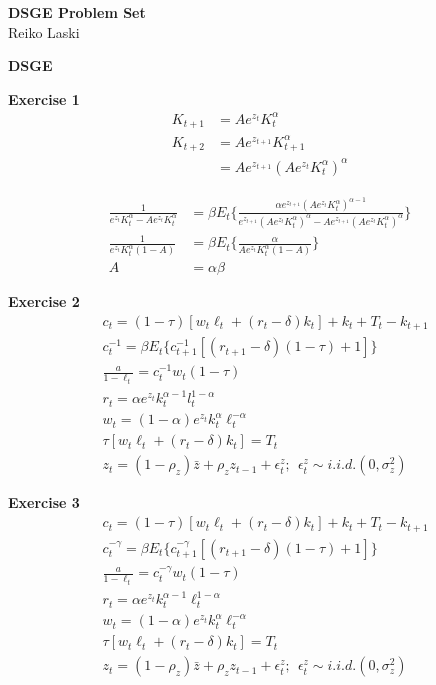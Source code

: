 \documentclass[letterpaper,12pt]{article}
\theoremstyle{definition}
\begin{document}
\begin{flushleft}
  \textbf{\large{DSGE Problem Set}} \\
  Reiko Laski
\end{flushleft}

\textbf{\large{DSGE}}

\textbf{Exercise 1}
\begin{align*}
  K_{t+1} &= Ae^{z_t}K_t^\alpha \\
  K_{t+2} &= Ae^{z_{t+1}}K_{t+1}^\alpha \\
  &= Ae^{z_{t+1}}(Ae^{z_t}K_t^\alpha)^\alpha
\end{align*}

\begin{align*}
  \frac{1}{e^{z_t}K_t^\alpha - Ae^{z_t}K_t^\alpha}
  &=
  \beta E_t\Big\{\frac{\alpha e^{z_{t+1}}(Ae^{z_t}K_t^\alpha)^{\alpha - 1}}{e^{z_{t+1}}(Ae^{z_t}K_t^\alpha)^\alpha-Ae^{z_{t+1}}(Ae^{z_t}K_t^\alpha)^\alpha}\Big\}
  \\
  \frac{1}{e^{z_t}K_t^\alpha(1-A)}
  &=
  \beta E_t\Big\{\frac{\alpha}{Ae^{z_t}K_t^\alpha(1-A)}\Big\}
  \\
  A &= \alpha\beta
\end{align*}

\textbf{Exercise 2}
\begin{align*}
  &c_t = (1-\tau) [w_t\ell_t+(r_t-\delta)k_t]+k_t+T_t-k_{t+1}
  \\
  &c_t^{-1} = \beta E_t\{c_{t+1}^{-1}[(r_{t+1}-\delta)(1-\tau)+1]\}
  \\
  &\frac{a}{1-\ell_t} = c_t^{-1}w_t(1-\tau)
  \\
  &r_t = \alpha e^{z_t}k_t^{\alpha-1} l_t^{1-\alpha}
  \\
  &w_t = (1-\alpha)e^{z_t}k_t^{\alpha}\ell_t^{-\alpha}
  \\
  &\tau[w_t\ell_t+(r_t-\delta)k_t] = T_t
  \\
  &z_t = (1-\rho_z)\bar{z}+\rho_zz_{t-1}+\epsilon_t^z; \ \ \epsilon_t^z \sim i.i.d.(0, \sigma_z^2)
\end{align*}

\textbf{Exercise 3}
\begin{align*}
  &c_t = (1-\tau) [w_t\ell_t+(r_t-\delta)k_t]+k_t+T_t-k_{t+1}
  \\
  &c_t^{-\gamma} = \beta E_t\{c_{t+1}^{-\gamma}[(r_{t+1}-\delta)(1-\tau)+1]\}
  \\
  &\frac{a}{1-\ell_t} = c_t^{-\gamma}w_t(1-\tau)
  \\
  &r_t = \alpha e^{z_t}k_t^{\alpha-1} \ell_t^{1-\alpha}
  \\
  &w_t = (1-\alpha)e^{z_t}k_t^{\alpha}\ell_t^{-\alpha}
  \\
  &\tau[w_t\ell_t+(r_t-\delta)k_t] = T_t
  \\
  &z_t = (1-\rho_z)\bar{z}+\rho_zz_{t-1}+\epsilon_t^z; \ \ \epsilon_t^z \sim i.i.d.(0, \sigma_z^2)
\end{align*}
\end{document}
